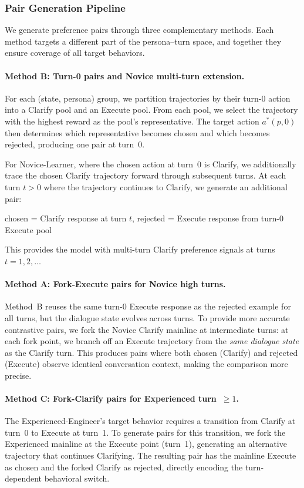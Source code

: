 \subsubsection{Pair Generation Pipeline}

We generate preference pairs through three complementary methods. Each method targets a different part of the persona--turn space, and together they ensure coverage of all target behaviors.

\paragraph{Method B: Turn-0 pairs and Novice multi-turn extension.}
For each (state, persona) group, we partition trajectories by their turn-0 action into a Clarify pool and an Execute pool. From each pool, we select the trajectory with the highest reward as the pool's representative. The target action $a^*(p, 0)$ then determines which representative becomes chosen and which becomes rejected, producing one pair at turn~0.

For Novice-Learner, where the chosen action at turn~0 is Clarify, we additionally trace the chosen Clarify trajectory forward through subsequent turns. At each turn $t > 0$ where the trajectory continues to Clarify, we generate an additional pair:
\begin{center}
\small
chosen = Clarify response at turn $t$, \quad rejected = Execute response from turn-0 Execute pool
\end{center}
This provides the model with multi-turn Clarify preference signals at turns $t = 1, 2, \ldots$

\paragraph{Method A: Fork-Execute pairs for Novice high turns.}
Method~B reuses the same turn-0 Execute response as the rejected example for all turns, but the dialogue state evolves across turns. To provide more accurate contrastive pairs, we fork the Novice Clarify mainline at intermediate turns: at each fork point, we branch off an Execute trajectory from the \emph{same dialogue state} as the Clarify turn. This produces pairs where both chosen (Clarify) and rejected (Execute) observe identical conversation context, making the comparison more precise.

\paragraph{Method C: Fork-Clarify pairs for Experienced turn~$\geq 1$.}
The Experienced-Engineer's target behavior requires a transition from Clarify at turn~0 to Execute at turn~1. To generate pairs for this transition, we fork the Experienced mainline at the Execute point (turn~1), generating an alternative trajectory that continues Clarifying. The resulting pair has the mainline Execute as chosen and the forked Clarify as rejected, directly encoding the turn-dependent behavioral switch.

